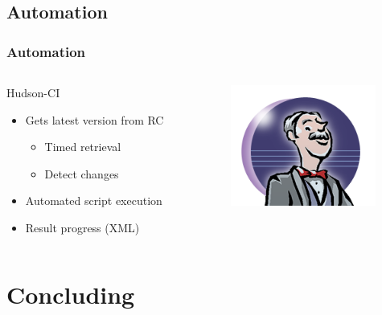 \documentclass[british,10pt]{beamer}
\begin{document}
\subsection{Automation}
\begin{frame}\frametitle{Automation}
\begin{columns}
\begin{column}{0.6\textwidth}
Hudson-CI
\begin{itemize}
\item Gets latest version from RC
\begin{itemize}
\item Timed retrieval
\item Detect changes
\end{itemize}
\item Automated script execution
\item Result progress (XML)
\end{itemize}
\end{column}
\includegraphics[width=0.8\textwidth]{images/hudson.png}
\end{columns}
\end{frame}

\section{Concluding}
\end{document}
